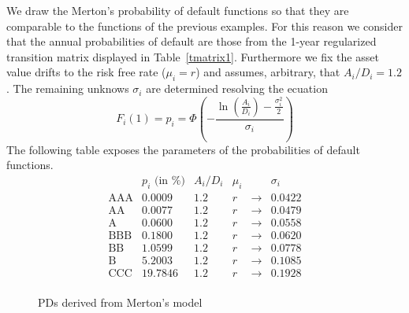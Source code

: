 \documentclass[11pt,fleqn]{book} %
\begin{document}
\begin{example}
	\label{ex:pdfmm}
	We draw the Merton's probability of default functions so that they are 
	comparable to the functions of the previous examples. For this reason
	we consider that the annual probabilities of default are those from the 
	1-year regularized transition matrix displayed in Table~\ref{tmatrix1}. 
	Furthermore we fix the asset value drifts to the risk free rate ($\mu_i=r$) 
	and assumes, arbitrary, that $A_i/D_i = 1.2$. The remaining unknows 
	$\sigma_i$ are determined resolving the ecuation
	\begin{displaymath}
		F_i(1) = p_i = \Phi\left( -\frac{\ln\left(\frac{A_i}{D_i} \right)  
		-\frac{\sigma_{i}^2}{2}}{\sigma_{i}}\right)
	\end{displaymath}
	The following table exposes the parameters of the probabilities of default
	functions.
	\begin{displaymath}
		\begin{array}{c|ccccc}
			          &    p_i\text{ (in \%)}  & A_i/D_i &  \mu_i & & \sigma_i \\
			\hline
			\text{AAA} &  0.0009 &   1.2   &   r    & \to & 0.0422 \\
			\text{AA}  &  0.0077 &   1.2   &   r    & \to & 0.0479 \\
			\text{A}   &  0.0600 &   1.2   &   r    & \to & 0.0558 \\
			\text{BBB} &  0.1800 &   1.2   &   r    & \to & 0.0620 \\
			\text{BB}  &  1.0599 &   1.2   &   r    & \to & 0.0778 \\
			\text{B}   &  5.2003 &   1.2   &   r    & \to & 0.1085 \\
			\text{CCC} & 19.7846 &   1.2   &   r    & \to & 0.1928 \\
		\end{array}
	\end{displaymath}
\end{example}

\begin{figure}[!ht]
	\centering
	\caption{PDs derived from Merton's model}
	\label{fig:pdfmm}
\end{figure}

\newpage
\end{document}
